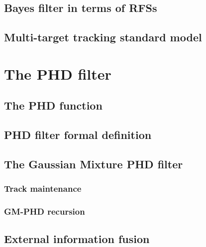 \documentclass[english,master,unicode]{ctufit-thesis}
\theoremstyle{plain}
\theoremstyle{definition}
\theoremstyle{remark}
\numberwithin{theorem}{chapter}
\begin{document}
        \subsection{Bayes filter in terms of RFSs}\label{sec:bayes-filter-rfs}
            
        \subsection{Multi-target tracking standard model}\label{sec:mtt-standard-model}
            
    \section{The PHD filter}\label{sec:phd-filter}
        
        \subsection{The PHD function}\label{sec:phd-function}
            
        \subsection{PHD filter formal definition}\label{sec:phd-filter-formal}
            
        \subsection{The Gaussian Mixture PHD filter}\label{sec:gm-phd}
            
            \subsubsection{Track maintenance}\label{sec:track-maintenance}
                
            \subsubsection{GM-PHD recursion}\label{sec:gm-phd-recursion}
                
        \subsection{External information fusion}\label{sec:gm-phd-fusion}
            

\end{document}
